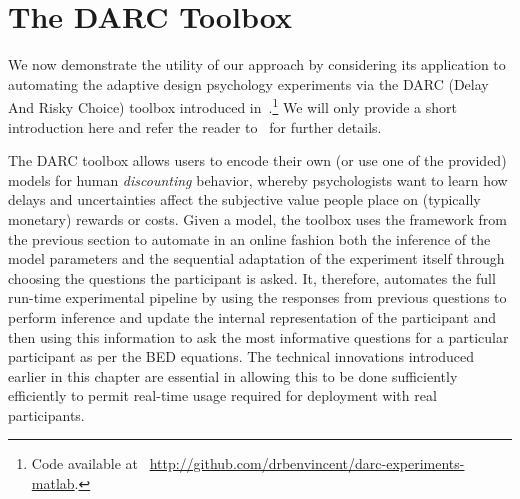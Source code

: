 
\section{The DARC Toolbox}
\label{sec:design:darc}

We now demonstrate the utility of our approach by considering its application 
to automating the adaptive design psychology experiments via the DARC (Delay
And Risky Choice) toolbox introduced in~\cite{vincent2017darc}.\footnote{Code available at~ \url{http://github.com/drbenvincent/darc-experiments-matlab}.}  We will only provide
a short introduction here and refer the reader to~\cite{vincent2017darc} for further details.

The DARC toolbox allows users 
to encode their own (or use one of the provided) models for human \emph{discounting} behavior,
whereby psychologists want to learn how delays and uncertainties affect the subjective value people place
on (typically monetary) rewards or costs. Given a model, the toolbox uses the framework from the
previous section to automate in an online fashion 
both the inference of the model parameters and the sequential adaptation of the experiment itself through
choosing the questions the participant is asked.  It, therefore, automates the full run-time experimental 
pipeline  by using the responses from previous questions to perform inference 
and update the internal representation
of the participant and then using this information to ask the most informative questions for a particular
participant as per the BED equations.  The technical innovations introduced earlier in this chapter
are essential in allowing this to be done sufficiently efficiently to permit
real-time usage required for deployment with real participants.

